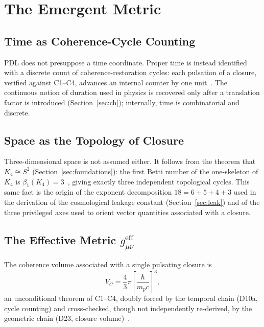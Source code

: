 \documentclass[11pt,a4paper]{article}
\newcommand{\Kfour}{K_4}
\newcommand{\VC}{V_C}
\begin{document}
\section{The Emergent Metric}
\label{sec:metric}

\subsection{Time as Coherence-Cycle Counting}

PDL does not presuppose a time coordinate. Proper time is instead identified with a discrete count of coherence-restoration cycles: each pulsation of a closure, verified against C1--C4, advances an internal counter by one unit~\citep{D10a}. The continuous notion of duration used in physics is recovered only after a translation factor is introduced (Section~\ref{sec:ch}); internally, time is combinatorial and discrete.

\subsection{Space as the Topology of Closure}
\label{sec:space}

Three-dimensional space is not assumed either. It follows from the theorem that $\Kfour\cong S^2$ (Section~\ref{sec:foundations}): the first Betti number of the one-skeleton of $\Kfour$ is $\beta_1(\Kfour)=3$~\citep{D23v2}, giving exactly three independent topological cycles. This same fact is the origin of the exponent decomposition $18=6+5+4+3$ used in the derivation of the cosmological leakage constant (Section~\ref{sec:leak}) and of the three privileged axes used to orient vector quantities associated with a closure.

\subsection{The Effective Metric \texorpdfstring{$g_{\mu\nu}^{\mathrm{eff}}$}{g\_mu\_nu\^{}eff}}

\begin{theorembox}[label=thm:VC]
The coherence volume associated with a single pulsating closure is
\begin{equation}
\VC = \frac{4}{3}\pi\left[\frac{\hbar}{m_p c}\right]^3,
\label{eq:VC}
\end{equation}
an unconditional theorem of C1--C4, doubly forced by the temporal chain (D10a, cycle counting) and cross-checked, though not independently re-derived, by the geometric chain (D23, closure volume)~\citep{D48v3}.
\end{theorembox}
\end{document}
